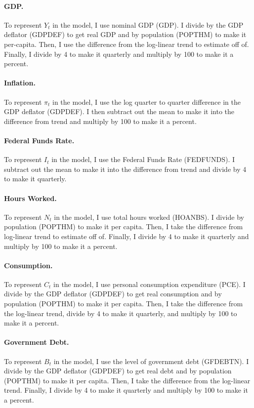 \paragraph{GDP.}
To represent $Y_t$ in the model, I use nominal GDP (GDP). I divide by the GDP deflator (GDPDEF) to get real GDP and by population (POPTHM) to make it per-capita. Then, I use the difference from the log-linear trend to estimate off of. Finally, I divide by 4 to make it quarterly and multiply by 100 to make it a percent.

\paragraph{Inflation.}
To represent $\pi_t$ in the model, I use the log quarter to quarter difference in the GDP deflator (GDPDEF). I then subtract out the mean to make it into the difference from trend and multiply by 100 to make it a percent.

\paragraph{Federal Funds Rate.}
To represent $I_t$ in the model, I use the Federal Funds Rate (FEDFUNDS). I subtract out the mean to make it into the difference from trend and divide by 4 to make it quarterly.

\paragraph{Hours Worked.}
To represent $N_t$ in the model, I use total hours worked (HOANBS). I divide by population (POPTHM) to make it per capita. Then, I take the difference from log-linear trend to estimate off of. Finally, I divide by 4 to make it quarterly and multiply by 100 to make it a percent.

\paragraph{Consumption.}
To represent $C_t$ in the model, I use personal consumption expenditure (PCE). I divide by the GDP deflator (GDPDEF) to get real consumption and by population (POPTHM) to make it per capita. Then, I take the difference from the log-linear trend, divide by 4 to make it quarterly, and multiply by 100 to make it a percent.

\paragraph{Government Debt.}
To represent $B_t$ in the model, I use the level of government debt (GFDEBTN). I divide by the GDP deflator (GDPDEF) to get real debt and by population (POPTHM) to make it per capita. Then, I take the difference from the log-linear trend. Finally, I divide by 4 to make it quarterly and multiply by 100 to make it a percent.

